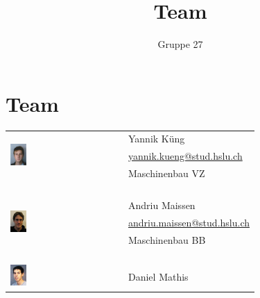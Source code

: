 \documentclass[a4paper,10pt,fleqn]{article}
\title{Team}
\author{Gruppe 27}
\begin{document}
\newcommand{\figwidth}{0.15\textwidth}

\section*{Team}

\begin{longtable}[l]{@{}p{}@{}p{}@{}}
    \\
    \multirow{3}{*}{\includegraphics[width=\figwidth]{../fig/tfkueng.png}}   & Yannik Küng \\
    & \href{mailto:yannik.kueng@stud.hslu.ch}{yannik.kueng@stud.hslu.ch} \\
    & Maschinenbau VZ \\
    & \\\\\\\\
    \multirow{3}{*}{\includegraphics[width=\figwidth]{../fig/mamaisse.png}} & Andriu Maissen \\
    & \href{mailto:andriu.maissen@stud.hslu.ch}{andriu.maissen@stud.hslu.ch} \\
    & Maschinenbau BB \\
    & \\\\\\\\
    \multirow{3}{*}{\includegraphics[width=\figwidth]{../fig/tfmathis.png}} & Daniel Mathis \\

\end{longtable}
\end{document}

